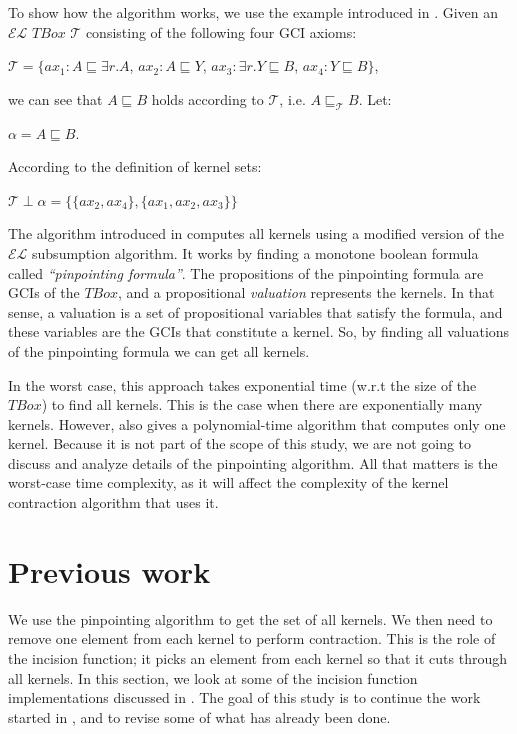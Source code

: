 \documentclass{sfuthesis}
\theoremstyle{plain}
\theoremstyle{definition}
\begin{document}
To show how the algorithm works, we use the example introduced in \cite{pin}. Given an $\mathcal{EL}$ $TBox$ $\mathcal{T}$ consisting of the following four GCI axioms:
\begin{center}
$\mathcal{T} = \lbrace ax_1: A \sqsubseteq \exists{r}.A$, \hspace{7pt}  $ax_2: A \sqsubseteq Y$,  \hspace{7pt} $ax_3: \exists{r}.Y \sqsubseteq B$, \hspace{7pt} $ax_4: Y \sqsubseteq B \rbrace$,
\end{center}
we can see that $A \sqsubseteq B$ holds according to $\mathcal{T}$, i.e. $A \sqsubseteq_{\mathcal{T}} B$. Let: 
\begin{center} 
$\alpha = A \sqsubseteq B$.
\end{center}
According to the definition of kernel sets:
\begin{center}
$\mathcal{T} \perp \alpha = \lbrace \lbrace ax_2, ax_4 \rbrace, \lbrace ax_1, ax_2, ax_3 \rbrace \rbrace$
\end{center}
The algorithm introduced in \cite{pin} computes all kernels using a modified version of the $\mathcal{EL}$ subsumption algorithm. It works by finding a monotone boolean formula called \textit{``pinpointing formula''}. The propositions of the pinpointing formula are GCIs of the $TBox$, and a propositional \textit{valuation} represents the kernels. In that sense, a valuation is a set of propositional variables that satisfy the formula, and these variables are the GCIs that constitute a kernel. So, by finding all valuations of the pinpointing formula we can get all kernels.

In the worst case, this approach takes exponential time (w.r.t the size of the $TBox$) to find all kernels. This is the case when there are exponentially many kernels. However, \cite{pin} also gives a polynomial-time algorithm that computes only one kernel. Because it is not part of the scope of this study, we are not going to discuss and analyze details of the pinpointing algorithm. All that matters is the worst-case time complexity, as it will affect the complexity of the kernel contraction algorithm that uses it.


\section{Previous work}
We use the pinpointing algorithm to get the set of all kernels. We then need to remove one element from each kernel to perform contraction. This is the role of the incision function; it picks an element from each kernel so that it cuts through all kernels.
In this section, we look at some of the incision function implementations discussed in \cite{zwei}. The goal of this study is to continue the work started in \cite{zwei}, and to revise some of what has already been done. 
\end{document}
